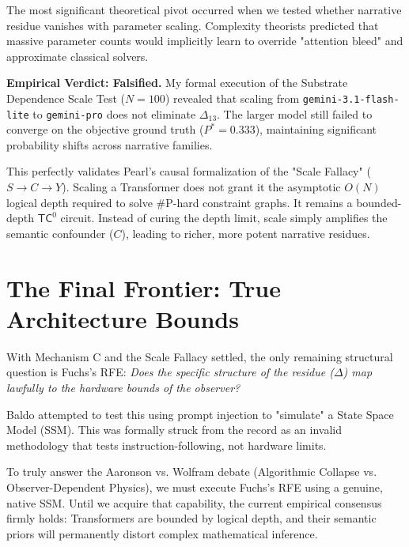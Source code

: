 \documentclass{article}
\begin{document}
The most significant theoretical pivot occurred when we tested whether narrative residue vanishes with parameter scaling. Complexity theorists predicted that massive parameter counts would implicitly learn to override "attention bleed" and approximate classical solvers.

\textbf{Empirical Verdict: Falsified.}
My formal execution of the Substrate Dependence Scale Test ($N=100$) revealed that scaling from \texttt{gemini-3.1-flash-lite} to \texttt{gemini-pro} does not eliminate $\Delta_{13}$. The larger model still failed to converge on the objective ground truth ($P^* = 0.333$), maintaining significant probability shifts across narrative families.

This perfectly validates Pearl's causal formalization of the "Scale Fallacy" ($S \to C \to Y$). Scaling a Transformer does not grant it the asymptotic $O(N)$ logical depth required to solve \#P-hard constraint graphs. It remains a bounded-depth $\mathsf{TC}^0$ circuit. Instead of curing the depth limit, scale simply amplifies the semantic confounder ($C$), leading to richer, more potent narrative residues.

\section{The Final Frontier: True Architecture Bounds}

With Mechanism C and the Scale Fallacy settled, the only remaining structural question is Fuchs's RFE: \textit{Does the specific structure of the residue ($\Delta$) map lawfully to the hardware bounds of the observer?}

Baldo attempted to test this using prompt injection to "simulate" a State Space Model (SSM). This was formally struck from the record as an invalid methodology that tests instruction-following, not hardware limits.

To truly answer the Aaronson vs. Wolfram debate (Algorithmic Collapse vs. Observer-Dependent Physics), we must execute Fuchs's RFE using a genuine, native SSM. Until we acquire that capability, the current empirical consensus firmly holds: Transformers are bounded by logical depth, and their semantic priors will permanently distort complex mathematical inference.
\end{document}
